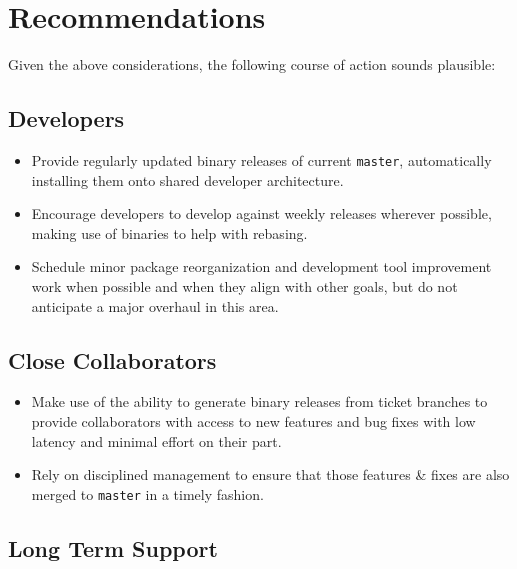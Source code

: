\documentclass[letterpaper]{scrartcl}
\begin{document}
\section{Recommendations}
\label{sec:recommendations}

Given the above considerations, the following course of action sounds
plausible:

\subsection{Developers}

\begin{itemize}

  \item{Provide regularly updated binary releases of current \texttt{master},
  automatically installing them onto shared developer architecture.}

  \item{Encourage developers to develop against weekly releases wherever
  possible, making use of binaries to help with rebasing.}

  \item{Schedule minor package reorganization and development tool improvement
  work when possible and when they align with other goals, but do not
  anticipate a major overhaul in this area.}

\end{itemize}

\subsection{Close Collaborators}

\begin{itemize}

  \item{Make use of the ability to generate binary releases from ticket
  branches to provide collaborators with access to new features and bug fixes
  with low latency and minimal effort on their part.}

  \item{Rely on disciplined management to ensure that those features \& fixes
  are also merged to \texttt{master} in a timely fashion.}

\end{itemize}

\subsection{Long Term Support}
\end{document}
